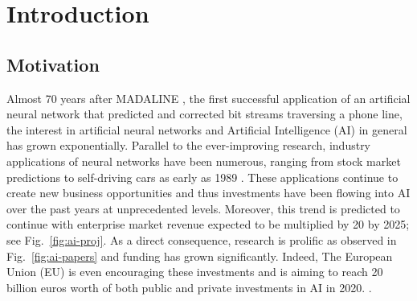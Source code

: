 \section{Introduction}

\subsection{Motivation}


Almost 70 years after MADALINE \cite{adaline}, the first successful application of an artificial neural network that predicted and corrected bit streams traversing a phone line, the interest in artificial neural networks and Artificial Intelligence (AI) in general has grown exponentially. Parallel to the ever-improving research, industry applications of neural networks have been numerous, ranging from stock market predictions \cite{smp} to self-driving cars as early as 1989 \cite{alvinn}. These applications continue to create new business opportunities and thus investments have been flowing into AI over the past years at unprecedented levels. Moreover, this trend is predicted to continue with enterprise market revenue expected to be multiplied by 20 by 2025; see Fig.~\ref{fig:ai-proj}. As a direct consequence, research is prolific as observed in Fig.~\ref{fig:ai-papers} and funding has grown significantly. Indeed, The European Union (EU) is even encouraging these investments and is aiming to reach 20 billion euros worth of both public and private investments in AI in 2020. \cite{ai-invest}.

